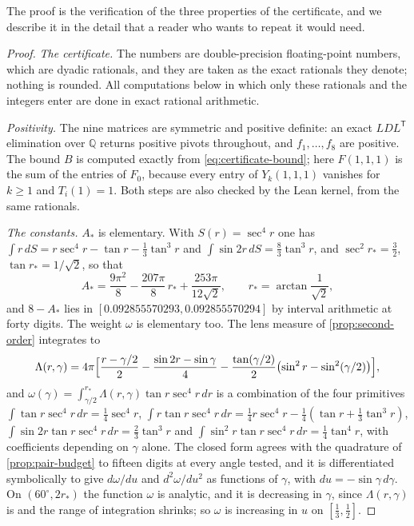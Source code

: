 \documentclass[11pt,reqno]{amsart}
\renewcommand{\_}{\origunderscore\allowbreak}
\numberwithin{equation}{section}
\theoremstyle{plain}
\theoremstyle{definition}
\theoremstyle{remark}
\begin{document}
The proof is the verification of the three properties of the
certificate, and we describe it in the detail that a reader who wants
to repeat it would need.

\begin{proof}
\emph{The certificate.} The numbers are double-precision floating-point
numbers, which are dyadic rationals, and they are taken as the exact
rationals they denote; nothing is rounded. All computations below in
which only these rationals and the integers enter are done in exact
rational arithmetic.

\emph{Positivity.} The nine matrices are symmetric and positive
definite: an exact $LDL^{\mathsf T}$ elimination over $\mathbb Q$ returns
positive pivots throughout, and $f_1,\dots,f_8$ are positive. The
bound $B$ is computed exactly from \eqref{eq:certificate-bound}; here
$F(1,1,1)$ is the sum of the entries of $F_0$, because every entry of
$Y_k(1,1,1)$ vanishes for $k\ge1$ and $T_i(1)=1$. Both steps are also
checked by the Lean kernel, from the same rationals.

\emph{The constants.} $A_*$ is elementary. With $S(r)=\sec^4r$ one has
$\int r\,dS=r\sec^4r-\tan r-\tfrac13\tan^3r$ and
$\int\sin2r\,dS=\tfrac83\tan^3r$, and $\sec^2r_*=\tfrac32$,
$\tan r_*=1/\sqrt2$, so that
\begin{equation}\label{eq:A-star-closed}
  A_*=\frac{9\pi^2}8-\frac{207\pi}8\,r_*+\frac{253\pi}{12\sqrt2},
  \qquad r_*=\arctan\frac1{\sqrt2},
\end{equation}
and $8-A_*$ lies in $[0.092855570293,0.092855570294]$ by interval
arithmetic at forty digits. The weight $\omega$ is elementary too. The
lens measure of \cref{prop:second-order} integrates to
\[
  \Lambda(r,\gamma)=4\pi\Bigl[\frac{r-\gamma/2}2-\frac{\sin2r-\sin\gamma}4
  -\frac{\tan(\gamma/2)}2\bigl(\sin^2r-\sin^2(\gamma/2)\bigr)\Bigr],
\]
and $\omega(\gamma)=\int_{\gamma/2}^{r_*}\Lambda(r,\gamma)\tan r\sec^4r\,dr$
is a combination of the four primitives
$\int\tan r\sec^4r\,dr=\tfrac14\sec^4r$,
$\int r\tan r\sec^4r\,dr=\tfrac14r\sec^4r-\tfrac14(\tan r+\tfrac13\tan^3r)$,
$\int\sin2r\tan r\sec^4r\,dr=\tfrac23\tan^3r$ and
$\int\sin^2r\tan r\sec^4r\,dr=\tfrac14\tan^4r$, with coefficients
depending on $\gamma$ alone. The closed form agrees with the quadrature
of \cref{prop:pair-budget} to fifteen digits at every angle tested, and
it is differentiated symbolically to give $d\omega/du$ and $d^2\omega/du^2$
as functions of $\gamma$, with $du=-\sin\gamma\,d\gamma$. On
$(60^\circ,2r_*)$ the function $\omega$ is analytic, and it is decreasing
in $\gamma$, since $\Lambda(r,\gamma)$ is and the range of integration
shrinks; so $\omega$ is increasing in $u$ on $[\tfrac13,\tfrac12]$.


\end{proof}
\end{document}
